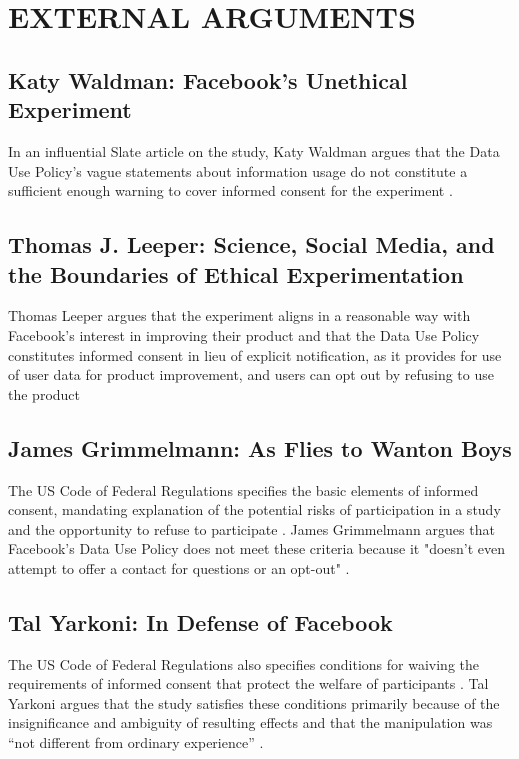 \section{EXTERNAL ARGUMENTS}
\subsection{Katy Waldman: Facebook's Unethical Experiment}
In an influential Slate article on the study, Katy Waldman argues that the Data Use Policy's vague statements about information usage do not constitute a sufficient enough warning to cover informed consent for the experiment \cite{slate}.

\subsection{Thomas J. Leeper: Science, Social Media, and the Boundaries of Ethical Experimentation}
Thomas Leeper argues that the experiment aligns in a reasonable way with Facebook's interest in improving their product and that the Data Use Policy constitutes informed consent in lieu of explicit notification, as it provides for use of user data for product improvement, and users can opt out by refusing to use the product \cite{leeper}

\subsection{James Grimmelmann: As Flies to Wanton Boys}
The US Code of Federal Regulations specifies the basic elements of informed consent, mandating explanation of the potential risks of participation in a study and the opportunity to refuse to participate \cite{cfrconsent}.  James Grimmelmann argues that Facebook's Data Use Policy does not meet these criteria because it "doesn't even attempt to offer a contact for questions or an opt-out" \cite{laboratorium}.

\subsection{Tal Yarkoni: In Defense of Facebook}
The US Code of Federal Regulations also specifies conditions for waiving the requirements of informed consent that protect the welfare of participants \cite{csrwaive}.  Tal Yarkoni argues that the study satisfies these conditions primarily because of the insignificance and ambiguity of resulting effects \cite{defense} and that the manipulation was “not different from ordinary experience” \cite{defensedefense}.

